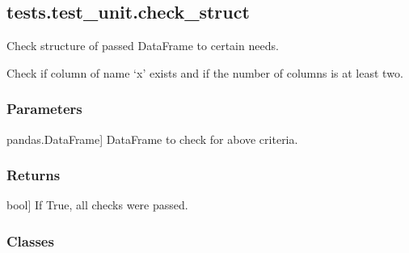 \documentclass[letterpaper,10pt,english]{sphinxmanual}
\begin{document}
\sphinxstepscope


\subsection{tests.test\_unit.check\_struct}
\label{\detokenize{_autosummary/tests.test_unit.check_struct:tests-test-unit-check-struct}}\label{\detokenize{_autosummary/tests.test_unit.check_struct::doc}}

\begin{fulllineitems}
\label{\detokenize{_autosummary/tests.test_unit.check_struct:tests.test_unit.check_struct}}
\pysigstartsignatures
{}
\pysigstopsignatures
\sphinxAtStartPar
Check structure of passed DataFrame to certain needs.

\sphinxAtStartPar
Check if column of name ‘x’ exists and if the number of columns is at
least two.


\subsubsection{Parameters}
\label{\detokenize{_autosummary/tests.test_unit.check_struct:parameters}}\begin{description}
\sphinxlineitem{structdata}{[}pandas.DataFrame{]}
\sphinxAtStartPar
DataFrame to check for above criteria.

\end{description}


\subsubsection{Returns}
\label{\detokenize{_autosummary/tests.test_unit.check_struct:returns}}\begin{description}
\sphinxlineitem{checkresult}{[}bool{]}
\sphinxAtStartPar
If True, all checks were passed.

\end{description}

\end{fulllineitems}

\subsubsection*{Classes}
\end{document}
